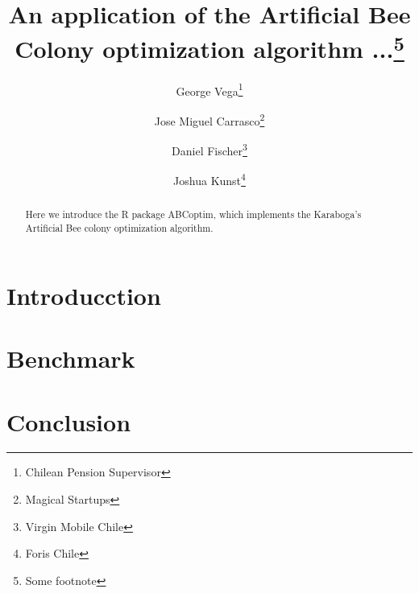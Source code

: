 \documentclass{article}
\title{An application of the Artificial Bee Colony optimization algorithm ...\footnote{Some footnote}}
\author{
George Vega\thanks{Chilean Pension Supervisor} \and
Jose Miguel Carrasco\thanks{Magical Startups} \and
Daniel Fischer\thanks{Virgin Mobile Chile} \and
Joshua Kunst\thanks{Foris Chile}
}
\begin{document}
\maketitle

\begin{abstract}
Here we introduce the R package ABCoptim, which implements the Karaboga's 
Artificial Bee colony optimization algorithm.
\end{abstract}

\section{Introducction}



\section{Benchmark}



\section{Conclusion}
\end{document}
